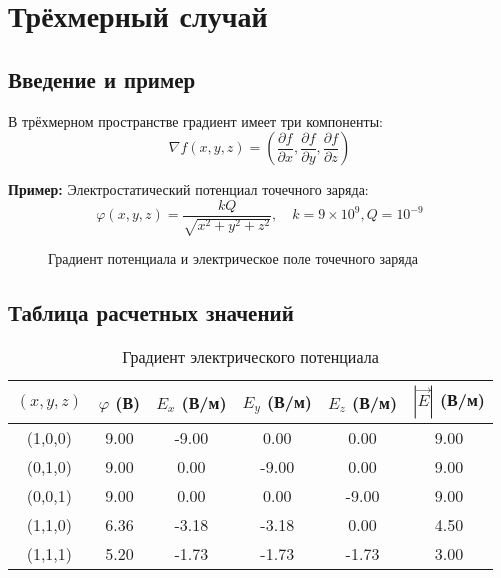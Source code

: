 \documentclass[12pt]{article}
\begin{document}
	\section{Трёхмерный случай}
	
	\subsection{Введение и пример}
	
	В трёхмерном пространстве градиент имеет три компоненты:
	\[
	\nabla f(x,y,z) = \left(\frac{\partial f}{\partial x}, \frac{\partial f}{\partial y}, \frac{\partial f}{\partial z}\right)
	\]
	
	\textbf{Пример:} Электростатический потенциал точечного заряда:
	\[
	\varphi(x,y,z) = \frac{kQ}{\sqrt{x^2 + y^2 + z^2}}, \quad k = 9\times10^9, Q = 10^{-9}
	\]
	
	\begin{figure}[H]
		\centering
		\caption{Градиент потенциала и электрическое поле точечного заряда}
	\end{figure}
	
	\subsection{Таблица расчетных значений}
	
	\begin{table}[H]
		\centering
		\caption{Градиент электрического потенциала}
		\begin{tabular}{cccccc}
			\toprule
			$(x,y,z)$ & $\varphi$ (В) & $E_x$ (В/м) & $E_y$ (В/м) & $E_z$ (В/м) & $|\vec{E}|$ (В/м) \\
			\midrule
			(1,0,0) & 9.00 & -9.00 & 0.00 & 0.00 & 9.00 \\
			(0,1,0) & 9.00 & 0.00 & -9.00 & 0.00 & 9.00 \\
			(0,0,1) & 9.00 & 0.00 & 0.00 & -9.00 & 9.00 \\
			(1,1,0) & 6.36 & -3.18 & -3.18 & 0.00 & 4.50 \\
			(1,1,1) & 5.20 & -1.73 & -1.73 & -1.73 & 3.00 \\
			\bottomrule
		\end{tabular}
	\end{table}
	
\end{document}
